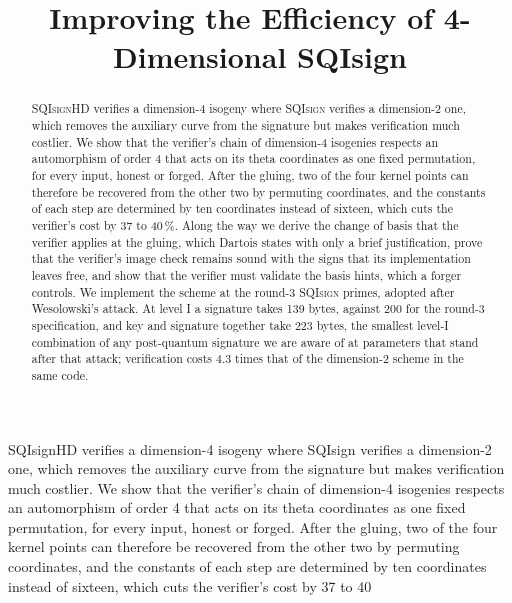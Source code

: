 \documentclass[version=preprint]{iacrcc}
\title{Improving the Efficiency of 4-Dimensional SQIsign}
\newcommand{\SQIsign}{SQI{\textsc{sign}}}
\begin{document}
    \maketitle

    \begin{textabstract}
SQIsignHD verifies a dimension-4 isogeny where SQIsign verifies a dimension-2 one, which removes the auxiliary curve from the signature but makes verification much costlier. We show that the verifier's chain of dimension-4 isogenies respects an automorphism of order 4 that acts on its theta coordinates as one fixed permutation, for every input, honest or forged. After the gluing, two of the four kernel points can therefore be recovered from the other two by permuting coordinates, and the constants of each step are determined by ten coordinates instead of sixteen, which cuts the verifier's cost by 37 to 40%
    \end{textabstract}

    \begin{abstract}
        {\SQIsign HD} verifies a dimension-4 isogeny where {\SQIsign} verifies a dimension-2 one, which removes the auxiliary curve from the signature but makes verification much costlier.
        We show that the verifier's chain of dimension-4 isogenies respects an automorphism of order 4 that acts on its theta coordinates as one fixed permutation, for every input, honest or forged. After the gluing, two of the four kernel points can therefore be recovered from the other two by permuting coordinates, and the constants of each step are determined by ten coordinates instead of sixteen, which cuts the verifier's cost by 37 to 40\,\%.
        Along the way we derive the change of basis that the verifier applies at the gluing, which Dartois states with only a brief justification, prove that the verifier's image check remains sound with the signs that its implementation leaves free, and show that the verifier must validate the basis hints, which a forger controls.
        We implement the scheme at the round-3 {\SQIsign} primes, adopted after Wesolowski's attack. At level I a signature takes 139 bytes, against 200 for the round-3 specification, and key and signature together take 223 bytes, the smallest level-I combination of any post-quantum signature we are aware of at parameters that stand after that attack; verification costs 4.3 times that of the dimension-2 scheme in the same code.
    \end{abstract}
\end{document}
